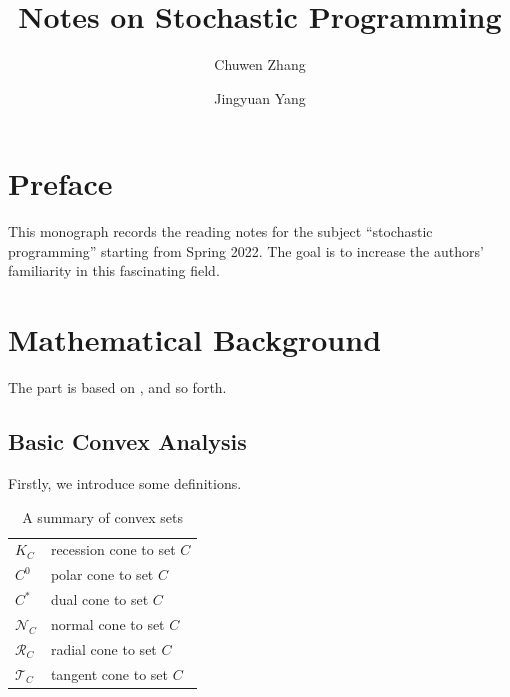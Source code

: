 \documentclass{beamerswitch}
\title{Notes on Stochastic Programming}
\begin{document}
\author[1]{\small Chuwen Zhang}
\author[1]{\small Jingyuan Yang}

\maketitle
\section{Preface}

This monograph records the reading notes for the subject ``stochastic programming'' starting from Spring 2022. The goal is to increase the authors' familiarity in this fascinating field.
\section{Mathematical Background}
The part is based on \cite{shapiro_lectures_2014}, \cite{birge_introduction_2011} and so forth.
\subsection{Basic Convex Analysis}

Firstly, we introduce some definitions.
\begin{table}[h!]
    \centering
    \begin{tabular}{l|l}
        \(K_C\)          & recession cone  to set \(C\) \\
        \(C^0\)          & polar cone to set \(C\)      \\
        \(C^*\)          & dual cone to set \(C\)       \\
        \(\mathcal N_C\) & normal cone to set \(C\)     \\
        \(\mathcal R_C\) & radial cone to set \(C\)     \\
        \(\mathcal T_C\) & tangent cone to set \(C\)
    \end{tabular}
    \caption{A summary of convex sets}
\end{table}
\end{document}
